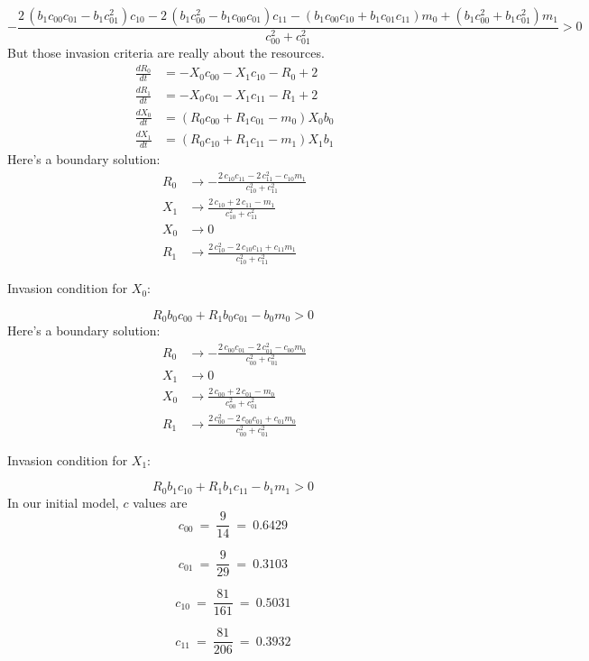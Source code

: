 \documentclass{article}
\begin{document}
\[-\frac{2 \, {\left(b_{1} c_{00} c_{01} - b_{1} c_{01}^{2}\right)} c_{10} - 2 \, {\left(b_{1} c_{00}^{2} - b_{1} c_{00} c_{01}\right)} c_{11} - {\left(b_{1} c_{00} c_{10} + b_{1} c_{01} c_{11}\right)} m_{0} + {\left(b_{1} c_{00}^{2} + b_{1} c_{01}^{2}\right)} m_{1}}{c_{00}^{2} + c_{01}^{2}} > 0 \
\]
But those invasion criteria are really about the resources.
\begin{align*}
\frac{dR_{0}}{dt} &= -X_{0} c_{00} - X_{1} c_{10} - R_{0} + 2\\
\frac{dR_{1}}{dt} &= -X_{0} c_{01} - X_{1} c_{11} - R_{1} + 2\\
\frac{dX_{0}}{dt} &= {\left(R_{0} c_{00} + R_{1} c_{01} - m_{0}\right)} X_{0} b_{0}\\
\frac{dX_{1}}{dt} &= {\left(R_{0} c_{10} + R_{1} c_{11} - m_{1}\right)} X_{1} b_{1}
\end{align*}Here's a boundary solution: \begin{align*}
  R_{0} &\to -\frac{2 \, c_{10} c_{11} - 2 \, c_{11}^{2} - c_{10} m_{1}}{c_{10}^{2} + c_{11}^{2}} \\
  X_{1} &\to \frac{2 \, c_{10} + 2 \, c_{11} - m_{1}}{c_{10}^{2} + c_{11}^{2}} \\
  X_{0} &\to 0 \\
  R_{1} &\to \frac{2 \, c_{10}^{2} - 2 \, c_{10} c_{11} + c_{11} m_{1}}{c_{10}^{2} + c_{11}^{2}}
\end{align*}

Invasion condition for $X_{0}$:

\[R_{0} b_{0} c_{00} + R_{1} b_{0} c_{01} - b_{0} m_{0} > 0 \
\]
Here's a boundary solution: \begin{align*}
  R_{0} &\to -\frac{2 \, c_{00} c_{01} - 2 \, c_{01}^{2} - c_{00} m_{0}}{c_{00}^{2} + c_{01}^{2}} \\
  X_{1} &\to 0 \\
  X_{0} &\to \frac{2 \, c_{00} + 2 \, c_{01} - m_{0}}{c_{00}^{2} + c_{01}^{2}} \\
  R_{1} &\to \frac{2 \, c_{00}^{2} - 2 \, c_{00} c_{01} + c_{01} m_{0}}{c_{00}^{2} + c_{01}^{2}}
\end{align*}

Invasion condition for $X_{1}$:

\[R_{0} b_{1} c_{10} + R_{1} b_{1} c_{11} - b_{1} m_{1} > 0 \
\]
In our initial model, $c$ values are
\[c_{00} \
=\
\frac{9}{14} \
=\
0.6429 \
\]

\[c_{01} \
=\
\frac{9}{29} \
=\
0.3103 \
\]

\[c_{10} \
=\
\frac{81}{161} \
=\
0.5031 \
\]

\[c_{11} \
=\
\frac{81}{206} \
=\
0.3932 \
\]
\end{document}
